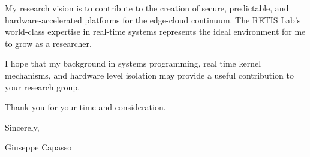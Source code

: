 \documentclass[11pt,a4paper]{article}
\begin{document}
My research vision is to contribute to the creation of secure, predictable, and hardware-accelerated platforms for the edge-cloud continuum. The RETIS Lab’s world-class expertise in real-time systems represents the ideal environment for me to grow as a researcher.

I hope that my background in systems programming, real time kernel mechanisms, and hardware level isolation may provide a useful contribution to your research group.

Thank you for your time and consideration.

\vspace{0.5cm}

Sincerely,

\vspace{0.5cm}

\hfill Giuseppe Capasso
\end{document}
